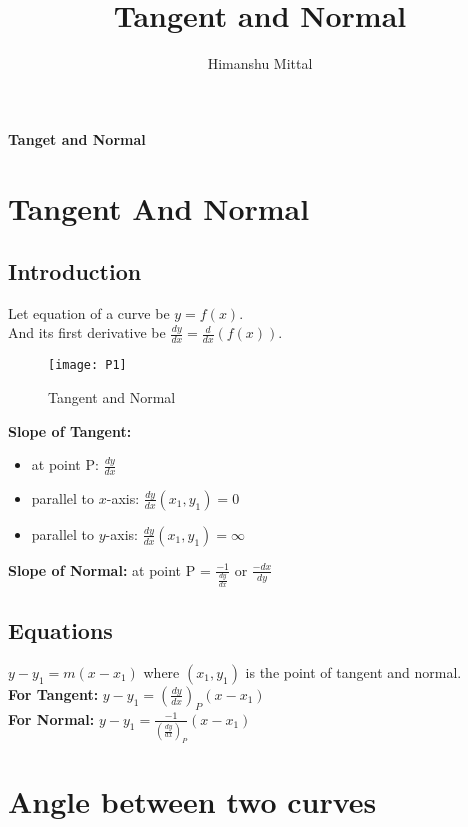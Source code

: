 \documentclass[11pt,a4paper,landscape]{article}
\author{Himanshu Mittal}
\title{Tangent and Normal}
\begin{document}
\begin{multicols*}{2}
\textbf{\Huge{Tanget and Normal}}
\section{Tangent And Normal}
	\subsection{Introduction}
	Let equation of a curve be $y=f(x)$.\\[1mm]
	And its first derivative be $\frac{dy}{dx}=\frac{d}{dx}(f(x))$.
	\begin{figure}[H]
		\centering
		\texttt{[image: P1]}
		\caption{Tangent and Normal}
	\end{figure}

	\textbf{Slope of Tangent:}
	\begin{itemize}
	\item at point P: $\frac{dy}{dx}$
	\item parallel to $x$-axis: $\frac{dy}{dx}(x_1,y_1)=0$
	\item parallel to $y$-axis: $\frac{dy}{dx}(x_1,y_1)=\infty$
	\end{itemize}

	\textbf{Slope of Normal:} at point P = $\frac{-1}{\frac{dy}{dx}}$ or $\frac{-dx}{dy}$
	\subsection{Equations}
	$y-y_1=m(x-x_1)$ where $(x_1,y_1)$ is the point of tangent and normal.\\[2mm]
	\textbf{For Tangent:} $y-y_1=\left(\frac{dy}{dx}\right)_P(x-x_1)$\\[3mm]
	\textbf{For Normal:} $y-y_1=\frac{-1}{\left(\frac{dy}{dx}\right)_P}(x-x_1)$
\section{Angle between two curves}

\end{multicols*}
\end{document}
